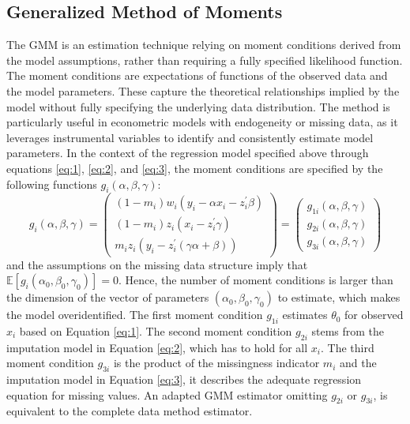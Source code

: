\subsection{Generalized Method of Moments}
The GMM is an estimation technique relying on moment conditions derived from the model assumptions, rather than requiring a fully specified likelihood function.
The moment conditions are expectations of functions of the observed data and the model parameters.
These capture the theoretical relationships implied by the model without fully specifying the underlying data distribution.
The method is particularly useful in econometric models with endogeneity or missing data, as it leverages instrumental variables to identify and consistently estimate model parameters.
In the context of the regression model specified above through equations \eqref{eq:1}, \eqref{eq:2}, and \eqref{eq:3}, the moment conditions are specified by the following functions $g_i(\alpha, \beta, \gamma)$:
\begin{equation}\label{eq:4}
    g_i(\alpha, \beta, \gamma) = \begin{pmatrix}
        (1-m_i)w_i(y_i - \alpha x_i - z_i^{\prime}\beta) \\
        (1-m_i)z_i (x_i - z_i^{\prime} \gamma) \\
        m_i z_i (y_i - z_i^{\prime} (\gamma \alpha + \beta))
    \end{pmatrix}
    = \begin{pmatrix}
        g_{1i}(\alpha, \beta, \gamma) \\
        g_{2i}(\alpha, \beta, \gamma) \\
        g_{3i}(\alpha, \beta, \gamma)
    \end{pmatrix}
\end{equation}
and the assumptions on the missing data structure imply that $\mathbb{E}[g_i(\alpha_0, \beta_0, \gamma_0)] = 0$.
Hence, the number of moment conditions is larger than the dimension of the vector of parameters $(\alpha_0, \beta_0, \gamma_0)$ to estimate, which makes the model overidentified.
The first moment condition $g_{1i}$ estimates $\theta_0$ for observed $x_i$ based on Equation \eqref{eq:1}.
The second moment condition $g_{2i}$ stems from the imputation model in Equation \eqref{eq:2}, which has to hold for all $x_i$.
The third moment condition $g_{3i}$ is the product of the missingness indicator $m_i$ and the imputation model in Equation \eqref{eq:3}, it describes the adequate regression equation for missing values.
An adapted GMM estimator omitting $g_{2i}$ or $g_{3i}$, is equivalent to the complete data method estimator.

